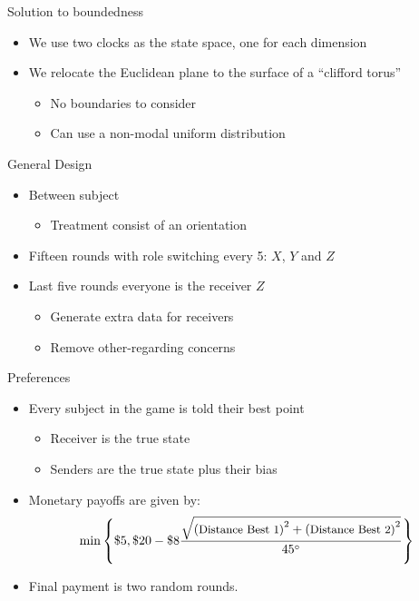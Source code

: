 \documentclass{beamer}
\begin{document}
\begin{frame}{Solution to boundedness}
	\begin{itemize}
		\item We use two clocks as the state space, one for each dimension
		\item We relocate the Euclidean plane to the surface of a ``clifford torus''
			\begin{itemize}
				\item No boundaries to consider
				\item Can use a non-modal uniform distribution
			\end{itemize}
	\end{itemize}
\end{frame}

\begin{frame}{General Design}
	\begin{itemize}
		\item Between subject
		\begin{itemize}
			\item Treatment consist of an orientation
		\end{itemize}
		\item Fifteen rounds with role switching every 5: $X$, $Y$ and $Z$
		\item Last five rounds everyone is the receiver $Z$
		\begin{itemize}
			\item Generate extra data for receivers
			\item Remove other-regarding concerns
		\end{itemize}
	\end{itemize}
\end{frame}

\begin{frame}{Preferences}
	\begin{itemize}
		\item Every subject in the game is told their best point
			\begin{itemize}
				\item Receiver is the true state
				\item Senders are the true state plus their bias
			\end{itemize}
		\item Monetary payoffs are given by:
		$$\min\left\{ \$5,\$20-\$8\frac{\sqrt{\textrm{(\small Distance Best \ensuremath{1})}^{2}+\textrm{(\small Distance Best \ensuremath{2})}^{2}}}{45^{\circ}}\right\}$$
		\item Final payment is two random rounds.
	\end{itemize}
\end{frame}
\end{document}
